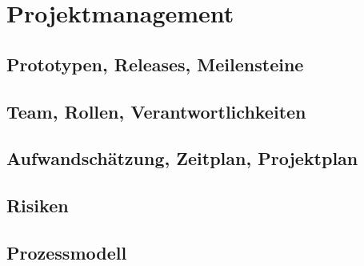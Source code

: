 \chapter{Projektmanagement}
\label{pm-projektmanagement}

\section{Prototypen, Releases, Meilensteine}


\section{Team, Rollen, Verantwortlichkeiten}


\section{Aufwandschätzung, Zeitplan, Projektplan}


\section{Risiken}


\section{Prozessmodell}